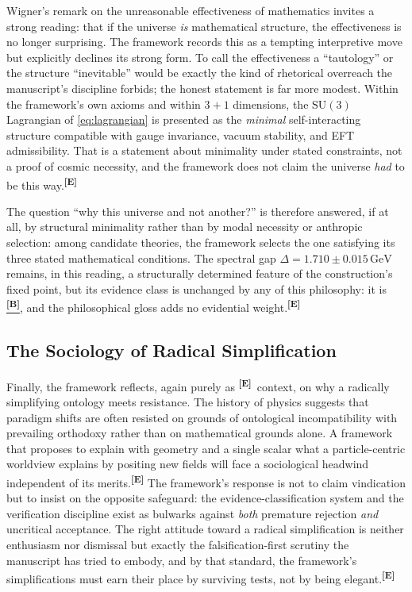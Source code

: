 \documentclass[12pt,a4paper,twoside]{article}
\theoremstyle{plain}
\theoremstyle{definition}
\theoremstyle{remark}
\newcommand{\GeV}{\,\mathrm{GeV}}
\newcommand{\catmark}[1]{\textsuperscript{\textsf{\textbf{[#1]}}}}
\newcommand{\Bdelta}{\hyperref[box:pi-override-delta]{\catmark{B}}}
\newcommand{\DeltaGap}{1.710 \pm 0.015\GeV} %
\begin{document}
Wigner's remark on the unreasonable effectiveness of mathematics invites a strong reading: that if the universe \emph{is} mathematical structure, the effectiveness is no longer surprising. The framework records this as a tempting interpretive move but explicitly declines its strong form. To call the effectiveness a ``tautology'' or the structure ``inevitable'' would be exactly the kind of rhetorical overreach the manuscript's discipline forbids; the honest statement is far more modest. Within the framework's own axioms and within $3+1$ dimensions, the $\mathrm{SU}(3)$ Lagrangian of \cref{eq:lagrangian} is presented as the \emph{minimal} self-interacting structure compatible with gauge invariance, vacuum stability, and EFT admissibility. That is a statement about minimality under stated constraints, not a proof of cosmic necessity, and the framework does not claim the universe \emph{had} to be this way.\catmark{E}

The question ``why this universe and not another?'' is therefore answered, if at all, by structural minimality rather than by modal necessity or anthropic selection: among candidate theories, the framework selects the one satisfying its three stated mathematical conditions. The spectral gap $\Delta = \DeltaGap$ remains, in this reading, a structurally determined feature of the construction's fixed point, but its evidence class is unchanged by any of this philosophy: it is \Bdelta, and the philosophical gloss adds no evidential weight.\catmark{E}

\subsection{The Sociology of Radical Simplification}
\label{subsec:sociology}

Finally, the framework reflects, again purely as \catmark{E}\ context, on why a radically simplifying ontology meets resistance. The history of physics suggests that paradigm shifts are often resisted on grounds of ontological incompatibility with prevailing orthodoxy rather than on mathematical grounds alone. A framework that proposes to explain with geometry and a single scalar what a particle-centric worldview explains by positing new fields will face a sociological headwind independent of its merits.\catmark{E} The framework's response is not to claim vindication but to insist on the opposite safeguard: the evidence-classification system and the verification discipline exist as bulwarks against \emph{both} premature rejection \emph{and} uncritical acceptance. The right attitude toward a radical simplification is neither enthusiasm nor dismissal but exactly the falsification-first scrutiny the manuscript has tried to embody, and by that standard, the framework's simplifications must earn their place by surviving tests, not by being elegant.\catmark{E}
\end{document}
